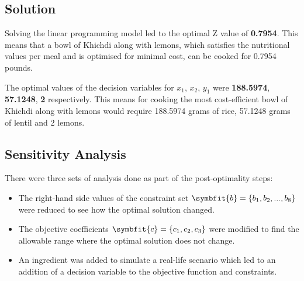 \documentclass[
]{article}
\begin{document}
\hypertarget{solution-1}{%
	\subsection{Solution}\label{solution-1}}

Solving the linear programming model led to the optimal Z value of \textbf{0.7954}.
This means that a bowl of Khichdi along with lemons, which satisfies the nutritional values per meal and is optimised for minimal cost, can be cooked for 0.7954 pounds.

The optimal values of the decision variables for \(x_1\), \(x_2\), \(y_1\) were \textbf{188.5974}, \textbf{57.1248}, \textbf{2} respectively. 
This means for cooking the most cost-efficient bowl of Khichdi along with lemons would require 188.5974 grams of rice, 57.1248 grams of lentil and 2 lemons.

\newpage

\hypertarget{sensitivity-analysis-1}{%
	\subsection{Sensitivity Analysis}\label{sensitivity-analysis-1}}

There were three sets of analysis done as part of the post-optimality steps:
\begin{itemize}
	\item The right-hand side values of the constraint set $\symbfit{b} = \{b_1, b_2, ..., b_8\}$ were reduced to see how the optimal solution changed.
	\item The objective coefficients $\symbfit{c} = \{c_1, c_2, c_3 \}$ were modified to find the allowable range where the optimal solution does not change.
	\item An ingredient was added to simulate a real-life scenario which led to an addition of a decision variable to the objective function and constraints.
\end{itemize}

\vspace{4em}
\end{document}
